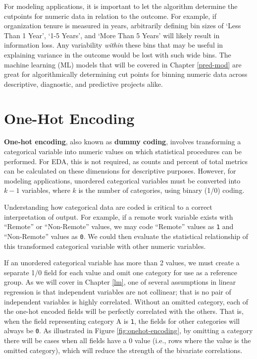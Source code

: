 \documentclass[
]{book}
\begin{document}
For modeling applications, it is important to let the algorithm determine the cutpoints for numeric data in relation to the outcome. For example, if organization tenure is measured in years, arbitrarily defining bin sizes of `Less Than 1 Year', `1-5 Years', and `More Than 5 Years' will likely result in information loss. Any variability \emph{within} these bins that may be useful in explaining variance in the outcome would be lost with such wide bins. The machine learning (ML) models that will be covered in Chapter \ref{pred-mod} are great for algorithmically determining cut points for binning numeric data across descriptive, diagnostic, and predictive projects alike.

\hypertarget{one-hot-encoding}{%
\section{One-Hot Encoding}\label{one-hot-encoding}}

\textbf{One-hot encoding}, also known as \textbf{dummy coding}, involves transforming a categorical variable into numeric values on which statistical procedures can be performed. For EDA, this is not required, as counts and percent of total metrics can be calculated on these dimensions for descriptive purposes. However, for modeling applications, unordered categorical variables must be converted into \(k-1\) variables, where \(k\) is the number of categories, using binary (1/0) coding.

Understanding how categorical data are coded is critical to a correct interpretation of output. For example, if a remote work variable exists with ``Remote'' or ``Non-Remote'' values, we may code ``Remote'' values as \texttt{1} and ``Non-Remote'' values as \texttt{0}. We could then evaluate the statistical relationship of this transformed categorical variable with other numeric variables.

If an unordered categorical variable has more than 2 values, we must create a separate 1/0 field for each value and omit one category for use as a reference group. As we will cover in Chapter \ref{lm}, one of several assumptions in linear regression is that independent variables are not collinear; that is no pair of independent variables is highly correlated. Without an omitted category, each of the one-hot encoded fields will be perfectly correlated with the others. That is, when the field representing category A is \texttt{1}, the fields for other categories will always be \texttt{0}. As illustrated in Figure \ref{fig:onehot-encoding}, by omitting a category there will be cases when all fields have a 0 value (i.e., rows where the value is the omitted category), which will reduce the strength of the bivariate correlations.
\end{document}
